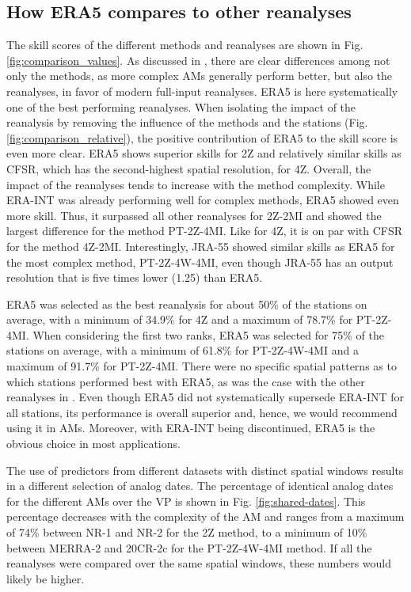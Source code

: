 \documentclass[alpha-refs]{wiley-article}
\begin{document}
\subsection{How ERA5 compares to other reanalyses}
\label{sec:results_skill}

The skill scores of the different methods and reanalyses are shown in Fig. \ref{fig:comparison_values}. As discussed in \citet{Horton2018b}, there are clear differences among not only the methods, as more complex AMs generally perform better, but also the reanalyses, in favor of modern full-input reanalyses. ERA5 is here systematically one of the best performing reanalyses. When isolating the impact of the reanalysis by removing the influence of the methods and the stations (Fig. \ref{fig:comparison_relative}), the positive contribution of ERA5 to the skill score is even more clear. ERA5 shows superior skills for 2Z and relatively similar skills as CFSR, which has the second-highest spatial resolution, for 4Z. Overall, the impact of the reanalyses tends to increase with the method complexity. While ERA-INT was already performing well for complex methods, ERA5 showed even more skill. Thus, it surpassed all other reanalyses for 2Z-2MI and showed the largest difference for the method PT-2Z-4MI. Like for 4Z, it is on par with CFSR for the method 4Z-2MI. Interestingly, JRA-55 showed similar skills as ERA5 for the most complex method, PT-2Z-4W-4MI, even though JRA-55 has an output resolution that is five times lower (1.25\degree) than ERA5.

ERA5 was selected as the best reanalysis for about 50\% of the stations on average, with a minimum of 34.9\% for 4Z and a maximum of 78.7\% for PT-2Z-4MI. When considering the first two ranks, ERA5 was selected for 75\% of the stations on average, with a minimum of 61.8\% for PT-2Z-4W-4MI and a maximum of 91.7\% for PT-2Z-4MI. There were no specific spatial patterns as to which stations performed best with ERA5, as was the case with the other reanalyses in \citet{Horton2018b}. Even though ERA5 did not systematically supersede ERA-INT for all stations, its performance is overall superior and, hence, we would recommend using it in AMs. Moreover, with ERA-INT being discontinued, ERA5 is the obvious choice in most applications.

The use of predictors from different datasets with distinct spatial windows results in a different selection of analog dates. The percentage of identical analog dates for the different AMs over the VP is shown in Fig. \ref{fig:shared-dates}. This percentage decreases with the complexity of the AM and ranges from a maximum of 74\% between NR-1 and NR-2 for the 2Z method, to a minimum of 10\% between MERRA-2 and 20CR-2c for the PT-2Z-4W-4MI method. If all the reanalyses were compared over the same spatial windows, these numbers would likely be higher.
\end{document}

